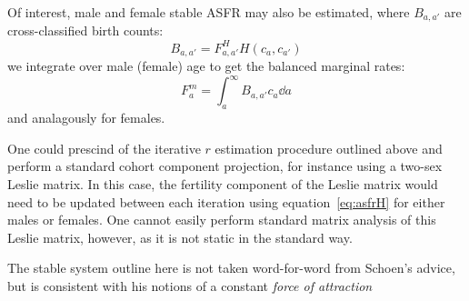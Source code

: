 Of interest, male and female stable ASFR may also be estimated, where
$B_{a,a'}$ are cross-classified birth counts:
\begin{equation}
B_{a,a'} = F_{a,a'}^H H(c_a,c_{a'})
\end{equation}
we integrate over male (female) age to get the balanced marginal rates:
\begin{equation}
\label{eq:asfrH}
F_a^m = \int_a ^\infty B_{a,a'} c_a \dd a
\end{equation}
and analagously for females. 

One could prescind of the iterative $r$ estimation procedure outlined above and
perform a standard cohort component projection, for instance using a
two-sex Leslie matrix. In this case, the fertility component of the Leslie
matrix would need to be updated between each iteration using equation~\ref{eq:asfrH} for either
males or females. One cannot easily perform standard matrix analysis of this
Leslie matrix, however, as it is not static in the standard way.

The stable system outline here is not taken word-for-word from Schoen's advice,
but is consistent with his notions of a constant \textit{force of attraction}





